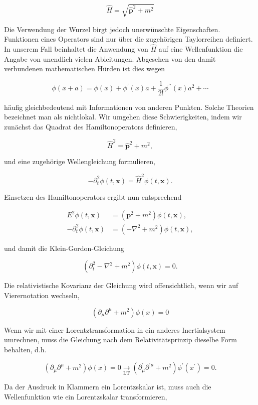 \documentclass[10pt, letterpaper]{article}
\begin{document}
$$
\hat{H}=\sqrt{\hat{\mathbf{p}}^{2}+m^{2}}
$$

Die Verwendung der Wurzel birgt jedoch unerwünschte Eigenschaften. Funktionen eines Operators sind nur über die zugehörigen Taylorreihen definiert. In unserem Fall beinhaltet die Anwendung von $\hat{H}$ auf eine Wellenfunktion die Angabe von unendlich vielen Ableitungen. Abgesehen von den damit verbundenen mathematischen Hürden ist dies wegen

$$
\phi(x+a)=\phi(x)+\phi^{\prime}(x) a+\frac{1}{2!} \phi^{\prime \prime}(x) a^{2}+\cdots
$$

häufig gleichbedeutend mit Informationen von anderen Punkten. Solche Theorien bezeichnet man als nichtlokal. Wir umgehen diese Schwierigkeiten, indem wir zunächst das Quadrat des Hamiltonoperators definieren,

$$
\hat{H}^{2}=\hat{\mathbf{p}}^{2}+m^{2},
$$

und eine zugehörige Wellengleichung formulieren,

$$
-\partial_{t}^{2} \phi(t, \mathbf{x})=\hat{H}^{2} \phi(t, \mathbf{x}) .
$$

Einsetzen des Hamiltonoperators ergibt nun entsprechend

$$
\begin{aligned}
E^{2} \phi(t, \mathbf{x}) & =\left(\mathbf{p}^{2}+m^{2}\right) \phi(t, \mathbf{x}), \\
-\partial_{t}^{2} \phi(t, \mathbf{x}) & =\left(-\nabla^{2}+m^{2}\right) \phi(t, \mathbf{x}),
\end{aligned}
$$

und damit die Klein-Gordon-Gleichung

$$
\left(\partial_{t}^{2}-\nabla^{2}+m^{2}\right) \phi(t, \mathbf{x})=0 .
$$

Die relativistische Kovarianz der Gleichung wird offensichtlich, wenn wir auf Vierernotation wechseln,

$$
\left(\partial_{\mu} \partial^{\mu}+m^{2}\right) \phi(x)=0
$$

Wenn wir mit einer Lorentztransformation in ein anderes Inertialsystem umrechnen, muss die Gleichung nach dem Relativitätsprinzip dieselbe Form behalten, d.h.

$$
\left(\partial_{\mu} \partial^{\mu}+m^{2}\right) \phi(x)=0 \underset{\mathrm{LT}}{\longrightarrow}\left(\partial_{\mu}^{\prime} \partial^{\prime \mu}+m^{2}\right) \phi^{\prime}\left(x^{\prime}\right)=0 .
$$

Da der Ausdruck in Klammern ein Lorentzskalar ist, muss auch die Wellenfunktion wie ein Lorentzskalar transformieren,
\end{document}

